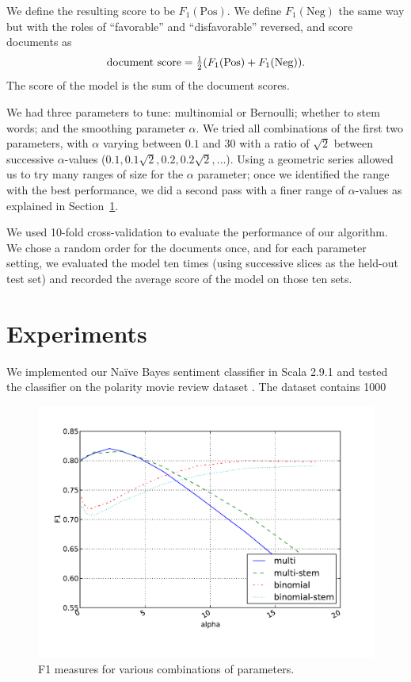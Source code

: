 \documentclass{article}
\newcommand{\PosC}{\mathrm{Pos}}
\newcommand{\NegC}{\mathrm{Neg}}
\begin{document}
We define the resulting score to be \(F_1(\PosC)\).
We define \(F_1(\NegC)\) the same way but with the roles of ``favorable'' and ``disfavorable'' reversed, and score documents as
\[\text{document score}=\tfrac12 (F_1(\PosC) + F_1(\NegC)) \ldotp\]
The score of the model is the sum of the document scores.

We had three parameters to tune: multinomial or Bernoulli; whether to stem words; and the smoothing parameter \(\alpha\).  We tried all combinations of the first two parameters, with \(\alpha\) varying between \(0.1\) and \(30\) with a ratio of \(\sqrt{2}\) between successive \(\alpha\)-values (\(0.1, 0.1\sqrt{2}, 0.2, 0.2\sqrt{2}, \dotsc\)).  Using a geometric series allowed us to try many ranges of size for the \(\alpha\) parameter; once we identified the range with the best performance, we did a second pass with a finer range of \(\alpha\)-values as explained in Section~\ref{sec:Results}.

We used 10-fold cross-validation to evaluate the performance of our algorithm.  We chose a random order for the documents once, and for each parameter setting, we evaluated the model ten times (using successive slices as the held-out test set) and recorded the average score of the model on those ten sets.


\section{Experiments}
\label{sec:Results}

We implemented our Na\"{i}ve Bayes sentiment classifier in Scala 2.9.1 and tested the classifier on the polarity movie review dataset \cite{polarity-dataset}. The dataset contains 1000  

\begin{figure}
  \centering
  \caption{F1 measures for various combinations of parameters.}
  \includegraphics[width=\textwidth]{graphs/all-combo.pdf}
\end{figure}
\end{document}

